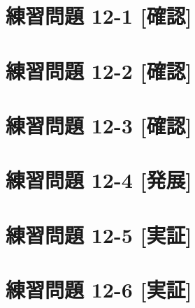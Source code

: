 \documentclass[
]{book}
\begin{document}
\hypertarget{ux7df4ux7fd2ux554fux984c-12-1-ux78baux8a8d}{%
\section*{練習問題 12-1 {[}確認{]}}\label{ux7df4ux7fd2ux554fux984c-12-1-ux78baux8a8d}}

\hypertarget{ux7df4ux7fd2ux554fux984c-12-2-ux78baux8a8d}{%
\section*{練習問題 12-2 {[}確認{]}}\label{ux7df4ux7fd2ux554fux984c-12-2-ux78baux8a8d}}

\hypertarget{ux7df4ux7fd2ux554fux984c-12-3-ux78baux8a8d}{%
\section*{練習問題 12-3 {[}確認{]}}\label{ux7df4ux7fd2ux554fux984c-12-3-ux78baux8a8d}}

\hypertarget{ux7df4ux7fd2ux554fux984c-12-4-ux767aux5c55}{%
\section*{練習問題 12-4 {[}発展{]}}\label{ux7df4ux7fd2ux554fux984c-12-4-ux767aux5c55}}

\hypertarget{ux7df4ux7fd2ux554fux984c-12-5-ux5b9fux8a3c}{%
\section*{練習問題 12-5 {[}実証{]}}\label{ux7df4ux7fd2ux554fux984c-12-5-ux5b9fux8a3c}}

\hypertarget{ux7df4ux7fd2ux554fux984c-12-6-ux5b9fux8a3c}{%
\section*{練習問題 12-6 {[}実証{]}}\label{ux7df4ux7fd2ux554fux984c-12-6-ux5b9fux8a3c}}

  
\end{document}
